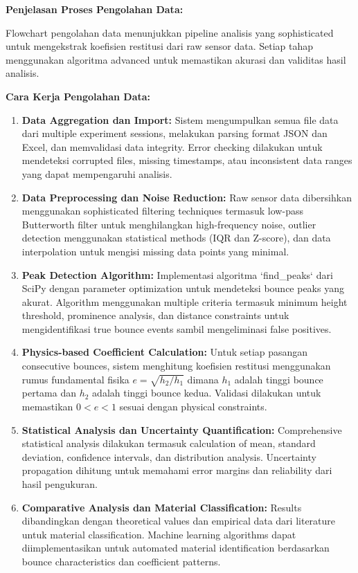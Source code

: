 \documentclass[a4paper,10pt]{article}
\begin{document}
\textbf{Penjelasan Proses Pengolahan Data:}

Flowchart pengolahan data menunjukkan pipeline analisis yang sophisticated untuk mengekstrak koefisien restitusi dari raw sensor data. Setiap tahap menggunakan algoritma advanced untuk memastikan akurasi dan validitas hasil analisis.

\textbf{Cara Kerja Pengolahan Data:}
\begin{enumerate}
\item \textbf{Data Aggregation dan Import:} Sistem mengumpulkan semua file data dari multiple experiment sessions, melakukan parsing format JSON dan Excel, dan memvalidasi data integrity. Error checking dilakukan untuk mendeteksi corrupted files, missing timestamps, atau inconsistent data ranges yang dapat mempengaruhi analisis.

\item \textbf{Data Preprocessing dan Noise Reduction:} Raw sensor data dibersihkan menggunakan sophisticated filtering techniques termasuk low-pass Butterworth filter untuk menghilangkan high-frequency noise, outlier detection menggunakan statistical methods (IQR dan Z-score), dan data interpolation untuk mengisi missing data points yang minimal.

\item \textbf{Peak Detection Algorithm:} Implementasi algoritma `find_peaks` dari SciPy dengan parameter optimization untuk mendeteksi bounce peaks yang akurat. Algorithm menggunakan multiple criteria termasuk minimum height threshold, prominence analysis, dan distance constraints untuk mengidentifikasi true bounce events sambil mengeliminasi false positives.

\item \textbf{Physics-based Coefficient Calculation:} Untuk setiap pasangan consecutive bounces, sistem menghitung koefisien restitusi menggunakan rumus fundamental fisika $e = \sqrt{h_2/h_1}$ dimana $h_1$ adalah tinggi bounce pertama dan $h_2$ adalah tinggi bounce kedua. Validasi dilakukan untuk memastikan $0 < e < 1$ sesuai dengan physical constraints.

\item \textbf{Statistical Analysis dan Uncertainty Quantification:} Comprehensive statistical analysis dilakukan termasuk calculation of mean, standard deviation, confidence intervals, dan distribution analysis. Uncertainty propagation dihitung untuk memahami error margins dan reliability dari hasil pengukuran.

\item \textbf{Comparative Analysis dan Material Classification:} Results dibandingkan dengan theoretical values dan empirical data dari literature untuk material classification. Machine learning algorithms dapat diimplementasikan untuk automated material identification berdasarkan bounce characteristics dan coefficient patterns.


\end{enumerate}
\end{document}
